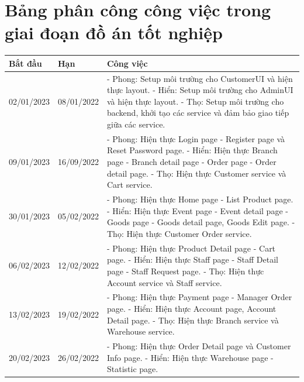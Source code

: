 \section{Bảng phân công công việc trong giai đoạn đồ án tốt nghiệp}
{
\setlength\extrarowheight{6pt}
\begin{longtable}{| p{2cm} | p{2cm} | p{10cm} |}

	\hline
	\textbf{Bắt đầu} & \textbf{Hạn} & \textbf{Công việc} \\
	\hline
	02/01/2023 & 08/01/2022 & 
    - Phong: Setup môi trường cho CustomerUI và hiện thực layout. 
    \newline
    - Hiển: Setup môi trường cho AdminUI và hiện thực layout.
    \newline
    - Thọ: Setup môi trường cho backend, khởi tạo các service và đảm bảo giao tiếp giữa các service. \\
	\hline
	09/01/2023 & 16/09/2022 & 
    - Phong: Hiện thực Login page - Register page và Reset Password page. 
    \newline
    - Hiển: Hiện thực Branch page - Branch detail page - Order page - Order detail page. 
    \newline
    - Thọ: Hiện thực Customer service và Cart service. \\
	\hline
	30/01/2023 & 05/02/2022 & 
    - Phong: Hiện thực Home page - List Product page. 
    \newline
    - Hiển: Hiện thực Event page - Event detail page - Goods page - Goods detail page, Goods Edit page. 
    \newline
    - Thọ: Hiện thực Customer Order service. \\
	\hline
	06/02/2023 & 12/02/2022 & 
    - Phong: Hiện thực Product Detail page - Cart page. 
    \newline
    - Hiển: Hiện thực Staff page - Staff Detail page - Staff Request page. 
    \newline
    - Thọ: Hiện thực Account service và Staff service. \\
	\hline
	13/02/2023 & 19/02/2022 & 
    - Phong: Hiện thực Payment page - Manager Order page. 
    \newline
    - Hiển: Hiện thực Account page, Account Detail page. 
    \newline
    - Thọ: Hiện thực Branch service và Warehouse service. \\
	\hline
	20/02/2023 & 26/02/2022 & 
    - Phong: Hiện thực Order Detail page và Customer Info page. 
    \newline
    - Hiển: Hiện thực Warehouse page - Statistic page. 

\end{longtable}}
